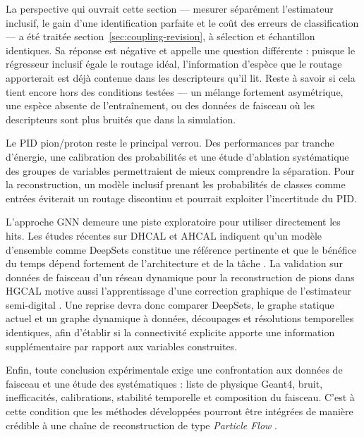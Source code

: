 La perspective qui ouvrait cette section — mesurer séparément l'estimateur inclusif, le gain d'une identification parfaite et le coût des erreurs de classification — a été traitée section~\ref{sec:coupling-revision}, à sélection et échantillon identiques. Sa réponse est négative et appelle une question différente : puisque le régresseur inclusif égale le routage idéal, l'information d'espèce que le routage apporterait est déjà contenue dans les descripteurs qu'il lit. Reste à savoir si cela tient encore hors des conditions testées — un mélange fortement asymétrique, une espèce absente de l'entraînement, ou des données de faisceau où les descripteurs sont plus bruités que dans la simulation.

Le PID pion/proton reste le principal verrou. Des performances par tranche d'énergie, une calibration des probabilités et une étude d'ablation systématique des groupes de variables permettraient de mieux comprendre la séparation. Pour la reconstruction, un modèle inclusif prenant les probabilités de classes comme entrées éviterait un routage discontinu et pourrait exploiter l'incertitude du PID.

L'approche GNN demeure une piste exploratoire pour utiliser directement les hits. Les études récentes sur DHCAL et AHCAL indiquent qu'un modèle d'ensemble comme DeepSets constitue une référence pertinente et que le bénéfice du temps dépend fortement de l'architecture et de la tâche \cite{borysova2025dhcalgnn,calice2024showerseparation}. La validation sur données de faisceau d'un réseau dynamique pour la reconstruction de pions dans HGCAL motive aussi l'apprentissage d'une correction graphique de l'estimateur semi-digital \cite{aamir2024hgcalgnn}. Une reprise devra donc comparer DeepSets, le graphe statique actuel et un graphe dynamique à données, découpages et résolutions temporelles identiques, afin d'établir si la connectivité explicite apporte une information supplémentaire par rapport aux variables construites.

Enfin, toute conclusion expérimentale exige une confrontation aux données de faisceau et une étude des systématiques : liste de physique Geant4, bruit, inefficacités, calibrations, stabilité temporelle et composition du faisceau. C'est à cette condition que les méthodes développées pourront être intégrées de manière crédible à une chaîne de reconstruction de type \emph{Particle Flow} \cite{thomson2009pandora}.
